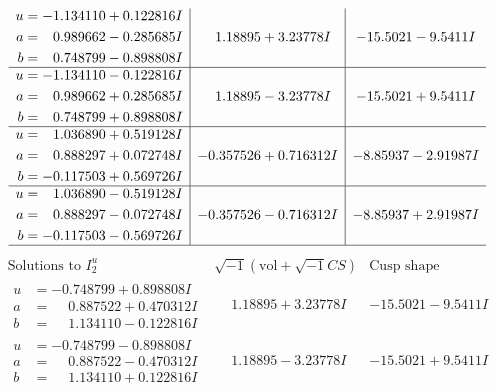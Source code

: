 \documentclass[1p]{elsarticle_modified}
\theoremstyle{definition}
\newcommand{\I}{\sqrt{-1}}
\begin{document}
$$\begin{array}{c|c|c}
\begin{aligned}
u &= -1.134110 + 0.122816 I \\
a &= \phantom{-}0.989662 - 0.285685 I \\
b &= \phantom{-}0.748799 - 0.898808 I\end{aligned}
 & \phantom{-}1.18895 + 3.23778 I & -15.5021 - 9.5411 I \\ \hline\begin{aligned}
u &= -1.134110 - 0.122816 I \\
a &= \phantom{-}0.989662 + 0.285685 I \\
b &= \phantom{-}0.748799 + 0.898808 I\end{aligned}
 & \phantom{-}1.18895 - 3.23778 I & -15.5021 + 9.5411 I \\ \hline\begin{aligned}
u &= \phantom{-}1.036890 + 0.519128 I \\
a &= \phantom{-}0.888297 + 0.072748 I \\
b &= -0.117503 + 0.569726 I\end{aligned}
 & -0.357526 + 0.716312 I & -8.85937 - 2.91987 I \\ \hline\begin{aligned}
u &= \phantom{-}1.036890 - 0.519128 I \\
a &= \phantom{-}0.888297 - 0.072748 I \\
b &= -0.117503 - 0.569726 I\end{aligned}
 & -0.357526 - 0.716312 I & -8.85937 + 2.91987 I\\
 \hline 
 \end{array}$$\newpage$$\begin{array}{c|c|c}  
\text{Solutions to }I^u_{2}& \I (\text{vol} + \sqrt{-1}CS) & \text{Cusp shape}\\
 \hline 
\begin{aligned}
u &= -0.748799 + 0.898808 I \\
a &= \phantom{-}0.887522 + 0.470312 I \\
b &= \phantom{-}1.134110 - 0.122816 I\end{aligned}
 & \phantom{-}1.18895 + 3.23778 I & -15.5021 - 9.5411 I \\ \hline\begin{aligned}
u &= -0.748799 - 0.898808 I \\
a &= \phantom{-}0.887522 - 0.470312 I \\
b &= \phantom{-}1.134110 + 0.122816 I\end{aligned}
 & \phantom{-}1.18895 - 3.23778 I & -15.5021 + 9.5411 I \\ \hline\begin{aligned}

\end{aligned}
\end{array}$$
\end{document}
